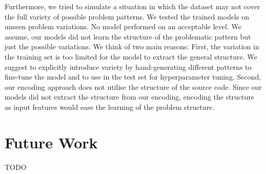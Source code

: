 Furthermore, we tried to simulate a situation in which the dataset may not cover the full variety of possible problem patterns. We tested the trained models on unseen problem variations. No model performed on an acceptable level. We assume, our models did not learn the structure of the problematic pattern but just the possible variations. 
We think of two main reasons: First, the variation in the training set is too limited for the model to extract the general structure. We suggest to explicitly introduce variety by hand-generating different patterns to fine-tune the model and to use in the test set for hyperparameter tuning.
Second, our encoding approach does not utilise the structure of the source code. Since our models did not extract the structure from our encoding, encoding the structure as input features would ease the learning of the problem structure.  

\section{Future Work}
TODO
